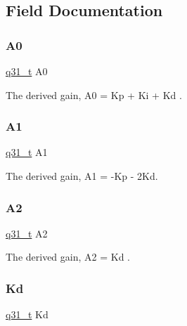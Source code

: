 \subsection{Field Documentation}
\mbox{\label{structarm__pid__instance__q31_ab58496a4137da4c667915a5fc0ef57ef}} 
\subsubsection{\texorpdfstring{A0}{A0}}
{\footnotesize\ttfamily \mbox{\hyperlink{arm__math_8h_adc89a3547f5324b7b3b95adec3806bc0}{q31\+\_\+t}} A0}

The derived gain, A0 = Kp + Ki + Kd . \mbox{\label{structarm__pid__instance__q31_aeb897c84724b56948e4222aca8d0e1f4}} 
\subsubsection{\texorpdfstring{A1}{A1}}
{\footnotesize\ttfamily \mbox{\hyperlink{arm__math_8h_adc89a3547f5324b7b3b95adec3806bc0}{q31\+\_\+t}} A1}

The derived gain, A1 = -\/Kp -\/ 2Kd. \mbox{\label{structarm__pid__instance__q31_a4ae945f839719fb2c04c978724b78ebb}} 
\subsubsection{\texorpdfstring{A2}{A2}}
{\footnotesize\ttfamily \mbox{\hyperlink{arm__math_8h_adc89a3547f5324b7b3b95adec3806bc0}{q31\+\_\+t}} A2}

The derived gain, A2 = Kd . \mbox{\label{structarm__pid__instance__q31_a213bbf14da7ea536998f611977173552}} 
\subsubsection{\texorpdfstring{Kd}{Kd}}
{\footnotesize\ttfamily \mbox{\hyperlink{arm__math_8h_adc89a3547f5324b7b3b95adec3806bc0}{q31\+\_\+t}} Kd}

